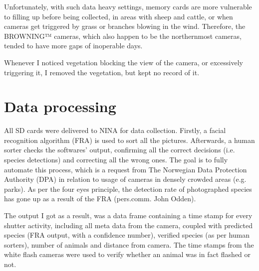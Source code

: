 Unfortunately, with such data heavy settings, memory cards are more vulnerable to filling up before being collected, in areas with sheep and cattle, or when cameras get triggered by grass or branches blowing in the wind. Therefore, the BROWNING™ cameras, which also happen to be the northernmost cameras, tended to have more gaps of inoperable days. %

Whenever I noticed vegetation blocking the view of the camera, or excessively triggering it, I removed the vegetation, but kept no record of it.









\section{Data processing} %
All SD cards were delivered to NINA for data collection. Firstly, a facial recognition algorithm (FRA)  is used to sort all the pictures. %
Afterwards, a human sorter checks the softwares' output, confirming all the correct decisions (i.e. species detections) and correcting all the wrong ones.
The goal is to fully automate this process, which is a request from The Norwegian Data Protection Authority (DPA) in relation to usage of cameras in densely crowded areas (e.g. parks).
As per the four eyes principle, the detection rate of photographed species has gone up as a result of the FRA (pers.comm. John Odden). 



The output I got as a result, was a data frame containing a time stamp for every shutter activity, %
including all meta data from the camera, coupled with predicted species (FRA output, with a confidence number), verified species (as per human sorters), number of animals and distance from camera. The time stamps from the white flash cameras were used to verify whether an animal was in fact flashed or not. 



